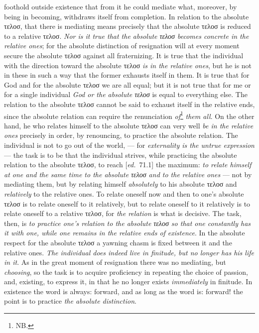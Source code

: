 \documentclass[12pt,a4paper,openany]{book}
\newcommand{\kpage}[1]{\marginnote{\footnotesize\textit{[#1]}}}
\newcommand{\ed}[1]{{\small[\textit{ed.}\ #1]}}
\begin{document}
foothold outside existence that from it he could mediate what,
moreover, by being in becoming, withdraws itself from completion. In
relation to the absolute τελοσ, that there is mediating means precisely
that the absolute τελοσ is reduced to a relative τελοσ. \emph{Nor is it
true that the absolute τελοσ becomes concrete in the relative ones}; for the absolute
distinction of resignation will at every moment secure the absolute
τελοσ against all fraternizing. It is true that the individual with the direction\kpage{139}
toward the absolute τελοσ \emph{is in the relative ones}, but he is not in these
in such a way that the former exhausts itself in them. It is true that for God and
for the absolute τελοσ we are all equal; but it is not true that
for me or for a single individual \emph{God or the absolute τελοσ} is equal
to everything else. The relation to the absolute τελοσ cannot be said
to exhaust itself in the relative ends, since the absolute relation
can require the renunciation \emph{of}\footnote[72]{
NB.}
\emph{them all}. On the other hand, he who relates
himself to the absolute τελοσ can very well \emph{be in the relative ones} precisely in order,
by renouncing, to practice the absolute relation. The individual is not to
go out of the world, --- for \emph{externality is the untrue expression} --- the task
is to be that the individual strives, while practicing the absolute
relation to the absolute τελοσ, to reach \ed{71.1} the maximum:
\emph{to relate himself at one and the same time to the absolute τελοσ and to the relative ones} --- not by
mediating them, but by relating himself \emph{absolutely} to his absolute
τελοσ and \emph{relatively} to the relative ones. To relate oneself now and then to
one's absolute τελοσ is to relate oneself to it relatively, but to relate oneself
to it relatively is to relate oneself to a relative τελοσ, for \emph{the relation}
is what is decisive. The task, then, is \emph{to practice one's relation to the absolute
τελοσ so that one constantly has it with one, while one remains in the relative
ends of existence}. In the absolute respect for the absolute τελοσ
a yawning chasm is fixed between it and the relative ones. \emph{The individual does indeed
live in finitude, but no longer has his life in it}. As in the great
moment of resignation there was no mediating, but \emph{choosing}, so the task is
to acquire proficiency in repeating the choice of passion, and,
existing, to express it, in that he no longer exists \emph{immediately}
in finitude. In existence the word is always: forward, and
as long as the word is: forward! the point is to practice \emph{the absolute distinction}.
\end{document}
